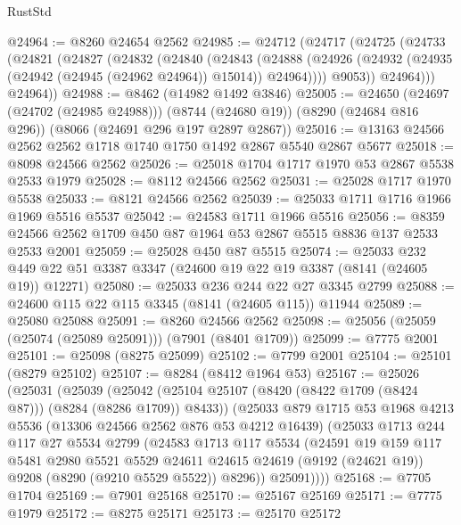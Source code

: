 \begin{lexlean}{RustStd}
\begin{coremodule}
@24964 := @8260 @24654 @2562
@24985 := @24712
    (@24717
      (@24725
        (@24733
          (@24821
            (@24827
              (@24832
                (@24840
                  (@24843
                    (@24888
                      (@24926 (@24932 (@24935 (@24942 (@24945 (@24962 @24964)) @15014)) @24964))))
                  @9053))
              @24964)))
        @24964))
@24988 := @8462 (@14982 @1492 @3846)
@25005 := @24650
    (@24697 (@24702 (@24985 @24988)))
    (@8744 (@24680 @19))
    (@8290 (@24684 @816 @296))
    (@8066 (@24691 @296 @197 @2897 @2867))
@25016 := @13163 @24566 @2562 @2562 @1718 @1740 @1750 @1492 @2867 @5540 @2867 @5677
@25018 := @8098 @24566 @2562
@25026 := @25018 @1704 @1717 @1970 @53 @2867 @5538 @2533 @1979
@25028 := @8112 @24566 @2562
@25031 := @25028 @1717 @1970 @5538
@25033 := @8121 @24566 @2562
@25039 := @25033 @1711 @1716 @1966 @1969 @5516 @5537
@25042 := @24583 @1711 @1966 @5516
@25056 := @8359 @24566 @2562 @1709 @450 @87 @1964 @53 @2867 @5515 @8836 @137 @2533 @2533 @2001
@25059 := @25028 @450 @87 @5515
@25074 := @25033
    @232
    @449
    @22
    @51
    @3387
    @3347
    (@24600 @19 @22 @19 @3387 (@8141 (@24605 @19)) @12271)
@25080 := @25033 @236 @244 @22 @27 @3345 @2799
@25088 := @24600 @115 @22 @115 @3345 (@8141 (@24605 @115)) @11944
@25089 := @25080 @25088
@25091 := @8260 @24566 @2562
@25098 := @25056 (@25059 (@25074 (@25089 @25091))) (@7901 (@8401 @1709))
@25099 := @7775 @2001
@25101 := @25098 (@8275 @25099)
@25102 := @7799 @2001
@25104 := @25101 (@8279 @25102)
@25107 := @8284 (@8412 @1964 @53)
@25167 := @25026
    (@25031
      (@25039
        (@25042 (@25104 @25107 (@8420 (@8422 @1709 (@8424 @87))) (@8284 (@8286 @1709)) @8433))
        (@25033
          @879
          @1715
          @53
          @1968
          @4213
          @5536
          (@13306 @24566 @2562 @876 @53 @4212 @16439)
          (@25033
            @1713
            @244
            @117
            @27
            @5534
            @2799
            (@24583
              @1713
              @117
              @5534
              (@24591
                @19
                @159
                @117
                @5481
                @2980
                @5521
                @5529
                @24611
                @24615
                @24619
                (@9192 (@24621 @19))
                @9208
                (@8290 (@9210 @5529 @5522))
                @8296))
            @25091))))
@25168 := @7705 @1704
@25169 := @7901 @25168
@25170 := @25167 @25169
@25171 := @7775 @1979
@25172 := @8275 @25171
@25173 := @25170 @25172

\end{coremodule}
\end{lexlean}
